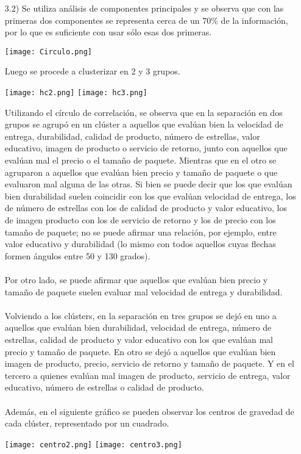\documentclass[11pt,a4paper]{report}
\begin{document}
\begin{itemize}
\begin{itemize}
\item[3.2)] Se utiliza análisis de componentes principales y se observa que con las primeras dos componentes se representa cerca de un $70\%$ de la información, por lo que es suficiente con usar sólo esas dos primeras.
\begin{center}
\texttt{[image: Circulo.png]}
\end{center}
Luego se procede a clusterizar en 2 y 3 grupos.
\begin{center}
\texttt{[image: hc2.png]}
\texttt{[image: hc3.png]}
\end{center}
Utilizando el círculo de correlación, se observa que en la separación en dos grupos se agrupó en un clúster a aquellos que evalúan bien la velocidad de entrega, durabilidad, calidad de producto, número de estrellas, valor educativo, imagen de producto o servicio de retorno, junto con aquellos que evalúan mal el precio o el tamaño de paquete. Mientras que en el otro se agruparon a aquellos que evalúan bien precio y tamaño de paquete o que evaluaron mal alguna de las otras. Si bien se puede decir que los que evalúan bien durabilidad suelen coincidir con los que evalúan velocidad de entrega, los de número de estrellas con los de calidad de producto y valor educativo, los de imagen producto con los de servicio de retorno y los de precio con los tamaño de paquete; no se puede afirmar una relación, por ejemplo, entre valor educativo y durabilidad (lo mismo con todos aquellos cuyas flechas formen ángulos entre 50 y 130 grados). \\
\\
Por otro lado, se puede afirmar que aquellos que evalúan bien precio y tamaño de paquete suelen evaluar mal velocidad de entrega y durabilidad.\\
\\
Volviendo a los clústers, en la separación en tres grupos se dejó en uno a aquellos que evalúan bien durabilidad, velocidad de entrega, número de estrellas, calidad de producto y valor educativo con los que evalúan mal precio y tamaño de paquete. En otro se dejó a aquellos que evalúan bien imagen de producto, precio, servicio de retorno y tamaño de paquete. Y en el tercero a quienes evalúan mal imagen de producto, servicio de entrega, valor educativo, número de estrellas o calidad de producto.\\
\\
Además, en el siguiente gráfico se pueden observar los centros de gravedad de cada clúster, representado por un cuadrado.
\begin{center}
\texttt{[image: centro2.png]}
\texttt{[image: centro3.png]}
\end{center}


\end{itemize}
\end{itemize}
\end{document}
